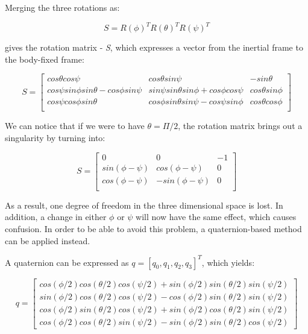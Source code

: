 Merging the three rotations as: 

 \begin{equation}
\label{S1}	
 	S=R(\phi)^{T}R(\theta)^{T}R(\psi)^{T}
 \end{equation}
 
gives the rotation matrix - \textit{S}, which expresses a vector from the inertial frame to the body-fixed frame: 
 
  \begin{equation}
\label{S2}
 S=\begin{bmatrix}
 	cos\theta cos\psi & cos\theta sin\psi & -sin\theta \\
 	cos\psi sin\phi sin\theta-cos\phi sin\psi & sin\psi sin\theta sin\phi+cos\phi cos\psi & cos\theta sin\phi \\
 	cos\psi cos\phi sin\theta & cos\phi sin\theta sin\psi-cos\psi sin\phi & cos\theta cos\phi \\
 	\end{bmatrix}
 	 \end{equation}
 	 
We can notice that if we were to have $\theta=\Pi/2$, the rotation matrix brings out a singularity by turning into:

  \begin{equation}
\label{S3}
 S=\begin{bmatrix}
 	0 & 0 & -1 \\
 	sin(\phi-\psi) & cos(\phi-\psi) & 0 \\
 	cos(\phi-\psi) & -sin(\phi-\psi) & 0 \\
 	\end{bmatrix}
 	 \end{equation}
 	 
As a result, one degree of freedom in the three dimensional space is lost. In addition, a change in either $\phi$ or $\psi$ will now have the same effect, which causes confusion. In order to be able to avoid this problem, a quaternion-based method can be applied instead. 

A quaternion can be expressed as $q=[q_{0}, q_{1}, q_{2}, q_{3}]^{T}$, which yields:

  \begin{equation}
\label{S4}
 q=\begin{bmatrix}
 	cos(\phi/2) cos(\theta/2) cos(\psi/2) + sin(\phi/2) sin(\theta/2) sin(\psi/2) \\
 	sin(\phi/2) cos(\theta/2) cos(\psi/2) - cos(\phi/2) sin(\theta/2) sin(\psi/2) \\
 	cos(\phi/2) sin(\theta/2) cos(\psi/2) + sin(\phi/2) cos(\theta/2) sin(\psi/2) \\
 	cos(\phi/2) cos(\theta/2) sin(\psi/2) - sin(\phi/2) sin(\theta/2) cos(\psi/2)
 	\end{bmatrix}
 	 \end{equation}
 	 
